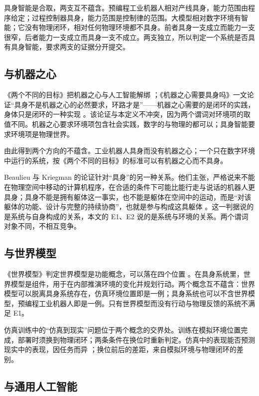 \documentclass[10pt,fontset=fandol]{ctexart}
\begin{document}
具身智能是合取，两支互不蕴含。预编程工业机器人相对产线具身，能力范围由程序给定；过程控制器具身，能力范围是控制律的范围。大模型相对数字环境有智能；它没有物理闭环，相对任何物理环境都不具身。前者具身一支成立而能力一支很窄，后者能力一支成立而具身一支不成立。两支独立，所以判定一个系统是否具有具身智能，要求两支的证据分开提交。

\subsection{与机器之心}

《两个不同的目标》把机器之心与人工智能解绑 \cite{yu2026two}；《机器之心需要具身吗》一文论证“具身不是机器之心的必然要求，环路才是”——机器之心需要的是闭环的实践，身体只是闭环的一种实现 \cite{yu2026blog}。该论证与本定义不冲突，因为两个谓词对环境项的取值不同。机器之心要求环境项包含社会实践，数字的与物理的都可以；具身智能要求环境项是物理世界。

由此得到两个方向的不蕴含。工业机器人具身而没有机器之心；一个只在数字环境中运行的系统，按《两个不同的目标》的标准可以有机器之心而不具身。

Beaulieu 与 Kriegman 的论证针对“具身”的另一种关系。他们主张，严格说来不能在物理空间中移动的计算机程序，在合适的条件下可能比能行走与说话的机器人更具身；具身不能是拥有躯体这一事实，也不能是躯体在空间中的运动，而是“对该躯体的功能、设计与完整的持续协商”，也就是参与构成这具躯体 \cite{beaulieu2023}。这一判据说的是系统与自身构成的关系，本文的 E1、E2 说的是系统与环境的关系。两个谓词对象不同，不相互竞争。

\subsection{与世界模型}

《世界模型》判定世界模型是功能概念，可以落在四个位置 \cite{yu2026wm}。在具身系统里，世界模型是组件，用于在内部推演环境的变化并规划行动。两个概念互不蕴含：世界模型可以脱离具身系统存在，仿真环境位置即是一例；具身系统也可以不含世界模型，预编程工业机器人即是一例。只有世界模型而没有行动与物理反馈的系统不满足 E1。

仿真训练中的“仿真到现实”问题位于两个概念的交界处。训练在模拟环境位置完成，部署时须换到物理闭环；两条条件在换位时重新判定。仿真中的表现能否预测现实中的表现，因任务而异 \cite{kadian2020,chebotar2019}；换位前后的差距，来自模拟环境与物理闭环的差别。

\subsection{与通用人工智能}
\end{document}
